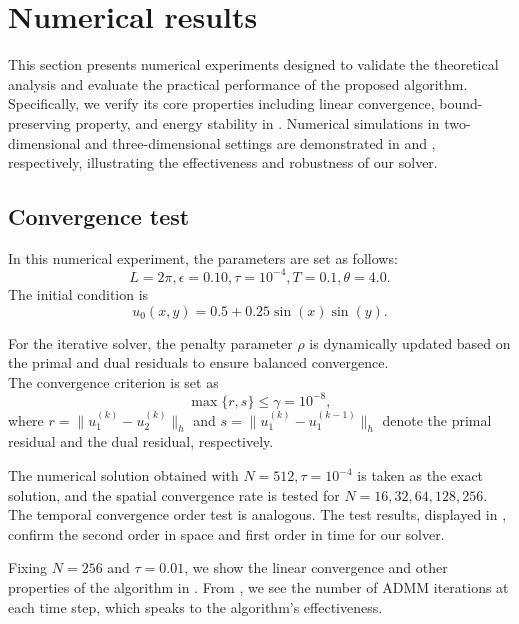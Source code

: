 \section{Numerical results}
\label{sec:numerical}
This section presents numerical experiments designed to validate the theoretical analysis and evaluate the practical performance of the proposed algorithm. 
Specifically, we verify its core properties including linear convergence, bound-preserving property, and energy stability in . 
Numerical simulations in two-dimensional and three-dimensional settings are demonstrated in  and , respectively, 
illustrating the effectiveness and robustness of our solver.


\subsection{Convergence test}
\label{subsec:test}
In this numerical experiment, the parameters are set as follows:
\begin{equation}
    L=2\pi, \epsilon=0.10, \tau=10^{-4}, T=0.1, \theta=4.0.
\end{equation}
The initial condition is
\begin{equation}
    u_0(x,y)=0.5+0.25\sin(x)\sin(y).
\end{equation}
\par For the iterative solver, the penalty parameter $\rho$ is dynamically updated based on the primal and dual residuals to ensure balanced convergence. \\
The convergence criterion is set as
\begin{equation}
    \max\{r,s\}\leq \gamma=10^{-8},
\end{equation}
where $r=\|u_1^{(k)}-u_2^{(k)}\|_h$ and $s=\|u_1^{(k)}-u_1^{(k-1)}\|_h$ denote the primal residual and the dual residual, respectively.
\par The numerical solution obtained with $N=512,\tau=10^{-4}$ is taken as the exact solution, and the spatial convergence rate is tested for $N=16,32,64,128,256$.
The temporal convergence order test is analogous.
The test results, displayed in , confirm the second order in space and first order in time for our solver.
\par Fixing $N=256$ and $\tau = 0.01$, we show the linear convergence and other properties of the algorithm in .
From , we see the number of ADMM iterations at each time step, which speaks to the algorithm's effectiveness. 
